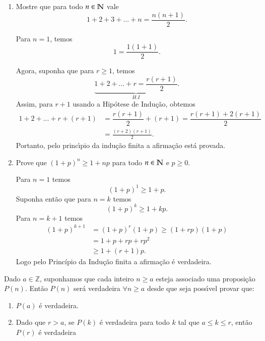\begin{exemplos}
	\begin{enumerate}
		\item Mostre que para todo $n \in \mathbb{N}$ vale
		\[
			1+2+3+...+n = \frac{n(n+1)}{2}.
		\]
		\begin{solucao}
			Para $n=1$, temos
			\[
				1=\displaystyle\frac{1(1+1)}{2}.
			\]

			Agora, suponha que para $r\geq 1$, temos
			\[
				\underbrace{1+2+...+r = \frac{r(r+1)}{2}}_{H.I}.
			\]
			Assim, para $r+1$ usando a Hip{\'o}tese de Indu{\c c}{\~a}o, obtemos
			\begin{align*}
				1+2+...+r+(r+1) &= \dfrac{r(r+1)}{2}+(r+1) = \dfrac{r(r+1)+2(r+1)}{2}\\ 
				&= \frac{(r+2)(r+1)}{2}.
			\end{align*}
			Portanto, pelo princ{\'\i}pio da indu{\c c}{\~a}o finita a afirmação está provada.
		\end{solucao}

		\item Prove que $(1 + p)^n \ge 1 + np$ para todo $n \in \mathbb{N}$ e $p \ge 0$.
		\begin{solucao}
			Para $n = 1$ temos
			\[
				(1 + p)^1 \ge 1 + p.
			\]
			Suponha então que para $n = k$ temos
			\[
				(1 + p)^k \ge 1 + kp.
			\]
			Para $n = k + 1$ temos
			\begin{align*}
				(1 + p)^{k + 1} &= (1 + p)^r(1 + p) \ge (1 + rp)(1 + p) \\ &= 1 + p + rp + rp^2 \\ &\ge 1 + (r + 1)p.
			\end{align*}
			Logo pelo Princípio da Indução finita a afirmação é verdadeira.
		\end{solucao}
	\end{enumerate}
\end{exemplos}




\begin{teorema}
Dado $a\in\mathbb{Z}$, suponhamos que cada inteiro $n\geq a$ esteja associado uma proposi{\c c}{\~a}o $P(n)$. Ent{\~a}o $P(n)$ ser{\'a} verdadeira $\forall n\geq a$ desde que seja poss{\'\i}vel provar que:
\begin{enumerate}
\item $P(a)$ {\'e} verdadeira.
\item Dado que $r > a$, se $P(k)$ {\'e} verdadeira para todo $k$ tal que $a \leq k \leq r$, ent{\~a}o $P(r)$ {\'e} verdadeira
\end{enumerate}
\end{teorema}

